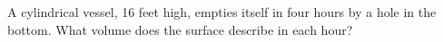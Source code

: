 A cylindrical vessel, 16 feet high, empties
itself in four hours by a hole in the bottom.
What volume does the surface describe in each hour?
